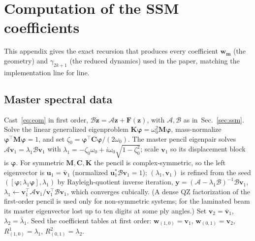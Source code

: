 \section{Computation of the SSM coefficients}\label{app:coeffs}

This appendix gives the exact recursion that produces every coefficient
$\bm w_{\bm m}$ (the geometry) and $\gamma_{2k+1}$ (the reduced dynamics) used in
the paper, matching the implementation line for line.

\subsection{Master spectral data}
Cast~\eqref{eq:eom} in first order, $\bm{\mathcal B}\dot{\bm z}=\bm{\mathcal A}\bm z
+\bm F(\bm z)$, with $\bm{\mathcal A},\bm{\mathcal B}$ as in~Sec.~\ref{sec:ssm}.
Solve the linear generalized eigenproblem $\bm K\bm\varphi=\omega_0^2\bm M\bm\varphi$,
mass-normalize $\bm\varphi^{\!\top}\bm M\bm\varphi=1$, and set
$\zeta_0=\bm\varphi^{\!\top}\bm C\bm\varphi/(2\omega_0)$. The master pencil eigenpair
solves $\bm{\mathcal A}\bm v_1=\lambda_1\bm{\mathcal B}\bm v_1$ with
$\lambda_1=-\zeta_0\omega_0+i\omega_0\sqrt{1-\zeta_0^2}$; scale $\bm v_1$ so its
displacement block is $\bm\varphi$. For symmetric $\bm M,\bm C,\bm K$ the pencil is complex-symmetric, so the left
eigenvector is $\bm u_1=\bar{\bm v}_1$ (normalized $\bm u_1^{*}\bm{\mathcal B}\bm v_1=1$);
$(\lambda_1,\bm v_1)$ is refined from the seed $([\bm\varphi;\lambda_1\bm\varphi],\lambda_1)$
by Rayleigh-quotient inverse iteration, $\bm y=(\bm{\mathcal A}-\lambda_1\bm{\mathcal B})^{-1}
\bm{\mathcal B}\bm v_1$, $\lambda_1\leftarrow\bm v_1^{\!\top}\bm{\mathcal A}\bm v_1/
\bm v_1^{\!\top}\bm{\mathcal B}\bm v_1$, which converges cubically. (A dense QZ
factorization of the first-order pencil is used only for non-symmetric systems; for the
laminated beam its master eigenvector lost up to ten digits at some ply angles.)
Set $\bm v_2=\bar{\bm v}_1$, $\lambda_2=\bar\lambda_1$. Seed the coefficient tables at first order:
$\bm w_{(1,0)}=\bm v_1$, $\bm w_{(0,1)}=\bm v_2$, $R^1_{(1,0)}=\lambda_1$,
$R^2_{(0,1)}=\lambda_2$.

